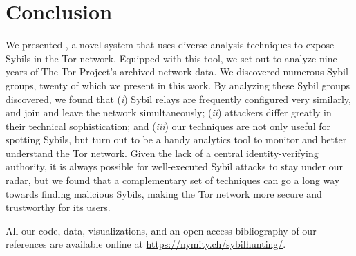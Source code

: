 \section{Conclusion}
\label{sec:conclusion}
We presented \sys, a novel system that uses diverse analysis techniques to
expose Sybils in the Tor network.  Equipped with this tool, we set out to
analyze nine years of The Tor Project's archived network data.  We discovered
numerous Sybil groups, twenty of which we present in this work.  By analyzing
these Sybil groups \sys discovered, we found that (\emph{i}) Sybil relays are
frequently configured very similarly, and join and leave the network
simultaneously; (\emph{ii}) attackers differ greatly in their technical
sophistication; and (\emph{iii}) our techniques are not only useful for spotting
Sybils, but turn out to be a handy analytics tool to monitor and better
understand the Tor network.  Given the lack of a central identity-verifying
authority, it is always possible for well-executed Sybil attacks to stay under
our radar, but we found that a complementary set of techniques can go a long way
towards finding malicious Sybils, making the Tor network more secure and
trustworthy for its users.

All our code, data, visualizations, and an open access bibliography of our
references are available online at \url{https://nymity.ch/sybilhunting/}.

